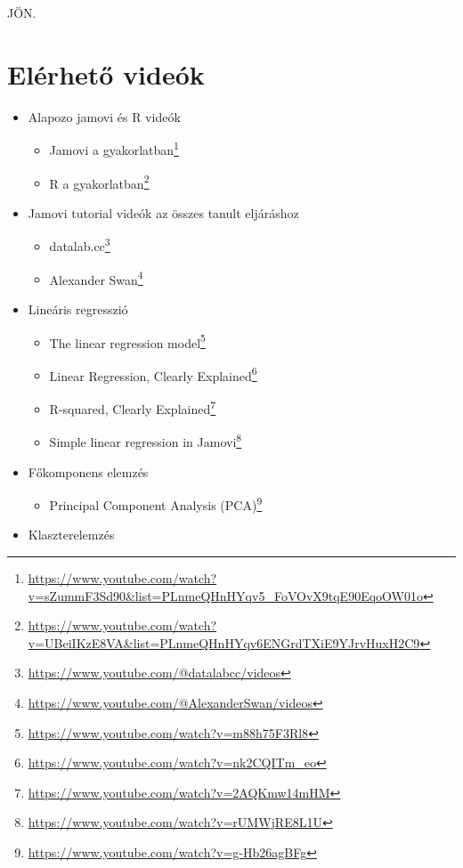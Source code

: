 \documentclass[
  letterpaper,
]{krantz}
\providecommand{\tightlist}{%
  \setlength{\itemsep}{0pt}\setlength{\parskip}{0pt}}\usepackage{longtable,booktabs,array}
\renewcommand{\href}[2]{#2\footnote{\url{#1}}}
\begin{document}
JÖN.

\appendix
{}

\hypertarget{sec-elerheto-videok}{%
\chapter{Elérhető videók}\label{sec-elerheto-videok}}

\begin{itemize}
\item
  Alapozo jamovi és R videók

  \begin{itemize}
  \tightlist
  \item
    \href{https://www.youtube.com/watch?v=sZummF3Sd90\&list=PLnmeQHnHYqv5_FoVOvX9tqE90EqoOW01o}{Jamovi
    a gyakorlatban}
  \item
    \href{https://www.youtube.com/watch?v=UBeiIKzE8VA\&list=PLnmeQHnHYqv6ENGrdTXiE9YJrvHuxH2C9}{R
    a gyakorlatban}
  \end{itemize}
\item
  Jamovi tutorial videók az összes tanult eljáráshoz

  \begin{itemize}
  \tightlist
  \item
    \href{https://www.youtube.com/@datalabcc/videos}{datalab.cc}
  \item
    \href{https://www.youtube.com/@AlexanderSwan/videos}{Alexander Swan}
  \end{itemize}
\item
  Lineáris regresszió

  \begin{itemize}
  \tightlist
  \item
    \href{https://www.youtube.com/watch?v=m88h75F3Rl8}{The linear
    regression model}
  \item
    \href{https://www.youtube.com/watch?v=nk2CQITm_eo}{Linear
    Regression, Clearly Explained}
  \item
    \href{https://www.youtube.com/watch?v=2AQKmw14mHM}{R-squared,
    Clearly Explained}
  \item
    \href{https://www.youtube.com/watch?v=rUMWjRE8L1U}{Simple linear
    regression in Jamovi}
  \end{itemize}
\item
  Főkomponens elemzés

  \begin{itemize}
  \tightlist
  \item
    \href{https://www.youtube.com/watch?v=g-Hb26agBFg}{Principal
    Component Analysis (PCA)}
  \end{itemize}
\item
  Klaszterelemzés


\end{itemize}
\end{document}
